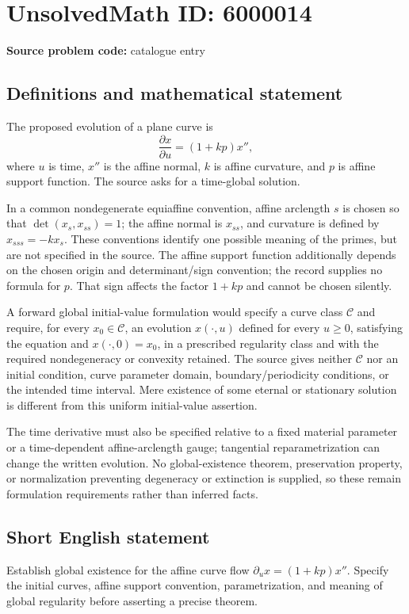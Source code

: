 \documentclass[11pt]{article}
\begin{document}
\section*{UnsolvedMath ID: 6000014}
\textbf{Source problem code:} catalogue entry
\subsection{Definitions and mathematical statement}
The proposed evolution of a plane curve is
\[
\frac{\partial x}{\partial u}=(1+kp)x'',
\]
where $u$ is time, $x''$ is the affine normal, $k$ is affine curvature, and $p$ is affine support function. The source asks for a time-global solution.

In a common nondegenerate equiaffine convention, affine arclength $s$ is chosen so that $\det(x_s,x_{ss})=1$; the affine normal is $x_{ss}$, and curvature is defined by $x_{sss}=-k x_s$. These conventions identify one possible meaning of the primes, but are not specified in the source. The affine support function additionally depends on the chosen origin and determinant/sign convention; the record supplies no formula for $p$. That sign affects the factor $1+kp$ and cannot be chosen silently.

A forward global initial-value formulation would specify a curve class $\mathcal C$ and require, for every $x_0\in\mathcal C$, an evolution $x(\cdot,u)$ defined for every $u\geq0$, satisfying the equation and $x(\cdot,0)=x_0$, in a prescribed regularity class and with the required nondegeneracy or convexity retained. The source gives neither $\mathcal C$ nor an initial condition, curve parameter domain, boundary/periodicity conditions, or the intended time interval. Mere existence of some eternal or stationary solution is different from this uniform initial-value assertion.

The time derivative must also be specified relative to a fixed material parameter or a time-dependent affine-arclength gauge; tangential reparametrization can change the written evolution. No global-existence theorem, preservation property, or normalization preventing degeneracy or extinction is supplied, so these remain formulation requirements rather than inferred facts.
\subsection{Short English statement}
Establish global existence for the affine curve flow $\partial_u x=(1+kp)x''$. Specify the initial curves, affine support convention, parametrization, and meaning of global regularity before asserting a precise theorem.
\end{document}
